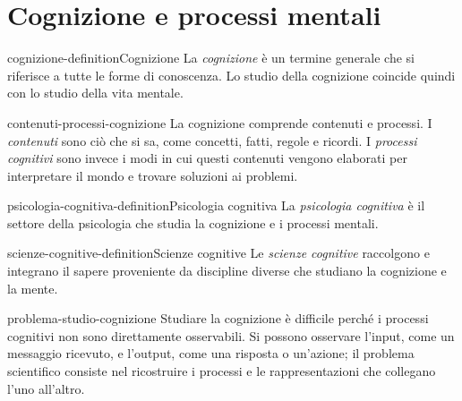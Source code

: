 \documentclass[preview]{standalone}
\begin{document}
\genpage

\section{Cognizione e processi mentali}

\begin{snippetdefinition}{cognizione-definition}{Cognizione}
    La \emph{cognizione} è un termine generale che si riferisce a tutte le forme
    di conoscenza. Lo studio della cognizione coincide quindi con lo studio
    della vita mentale.
\end{snippetdefinition}

\begin{snippet}{contenuti-processi-cognizione}
    La cognizione comprende contenuti e processi. I \emph{contenuti} sono ciò
    che si sa, come concetti, fatti, regole e ricordi. I \emph{processi
    cognitivi} sono invece i modi in cui questi contenuti vengono elaborati per
    interpretare il mondo e trovare soluzioni ai problemi.
\end{snippet}


\begin{snippetdefinition}{psicologia-cognitiva-definition}{Psicologia cognitiva}
    La \emph{psicologia cognitiva} è il settore della psicologia che studia la
    cognizione e i processi mentali.
\end{snippetdefinition}

\begin{snippetdefinition}{scienze-cognitive-definition}{Scienze cognitive}
    Le \emph{scienze cognitive} raccolgono e integrano il sapere proveniente da
    discipline diverse che studiano la cognizione e la mente.
\end{snippetdefinition}


\begin{snippet}{problema-studio-cognizione}
    Studiare la cognizione è difficile perché i processi cognitivi non sono
    direttamente osservabili. Si possono osservare l'input, come un messaggio
    ricevuto, e l'output, come una risposta o un'azione; il problema scientifico
    consiste nel ricostruire i processi e le rappresentazioni che collegano
    l'uno all'altro.
\end{snippet}
\end{document}
